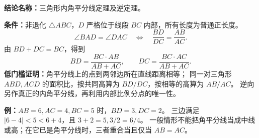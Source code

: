 \textbf{结论名称：}三角形内角平分线定理及逆定理。

\textbf{条件：}非退化 $\triangle ABC$，$D$ 严格位于线段 $BC$ 内部，所有长度为普通正长度。
\[
 \angle BAD=\angle DAC\quad\Longleftrightarrow\quad
 \frac{BD}{DC}=\frac{AB}{AC}.
\]
由 $BD+DC=BC$，得到
\[
 BD=\frac{BC\cdot AB}{AB+AC},\qquad DC=\frac{BC\cdot AC}{AB+AC}.
\]
\textbf{低门槛证明：}角平分线上的点到两邻边所在直线距离相等；
同一对三角形 $ABD,ACD$ 的面积比，按共同高算为 $BD/DC$，按相等的高算为 $AB/AC$。
逆向另作真正的内角平分线，再利用内部比例分点的唯一性。

\textbf{例：}$AB=6,AC=4,BC=5$ 时，$BD=3,DC=2$。
三边满足 $|6-4|<5<6+4$，且 $3+2=5,3/2=6/4$。
一般情形不能把角平分线当成中线或高；在它已是角平分线时，三者重合当且仅当 $AB=AC$。
